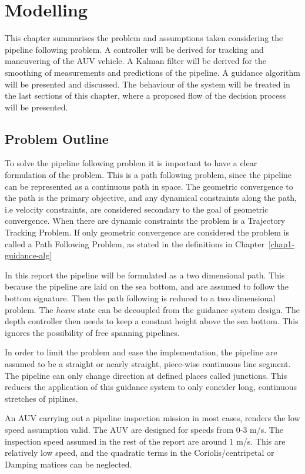 \chapter{Modelling}
	This chapter summarises the problem and assumptions taken considering the pipeline following problem.
	A controller will be derived for tracking and maneuvering of the AUV vehicle. A Kalman filter
	will be derived for the smoothing of measurements and predictions of the pipeline. A guidance algorithm will
	be presented and discussed. The behaviour of the system will be treated in the last sections of this chapter,
	where a proposed flow of the decision process will be presented.


\section{Problem Outline}
\label{chap2:problem}
	To solve the pipeline following problem it is important to have a clear formulation of the problem.
	This is a path following problem, since the pipeline can be represented as a continuous path in
	space. The geometric convergence to the path is the primary objective, and any dynamical
	constraints along the path, i.e velocity constraints, are considered secondary to the goal of
	geometric convergence. When there are dynamic constraints the problem is a Trajectory Tracking
	Problem. If only geometric convergence are considered the problem is called a Path Following Problem, 
	as stated in the definitions in Chapter~\ref{chap1-guidance-alg}

	In this report the pipeline will be formulated as a two dimensional path. This because the pipeline
	are laid on the sea bottom, and are assumed to follow the bottom signature. Then the path following
	is reduced to a two dimensional problem. The \textit{heave} state can be decoupled from the guidance 
	system design. The depth controller then needs to keep a constant height above the sea bottom.
	This ignores the possibility of free spanning pipelines.

	In order to limit the problem and ease the implementation, the pipeline are assumed to be a straight
	or nearly straight, piece-wise continuous line segment. The pipeline can only change direction at defined
	places called junctions. This reduces the application of this guidance system to only concider long,
	continuous stretches of piplines. 

	An AUV carrying out a pipeline inspection mission in most cases,  renders the low speed assumption valid.
	The \hugin AUV are designed for speeds from 0-3 m/s. The inspection speed assumed in the
	rest of the report are around 1 m/s. This are relatively low speed, and the quadratic terms in the
	Coriolis/centripetal or Damping matices can be neglected. 

